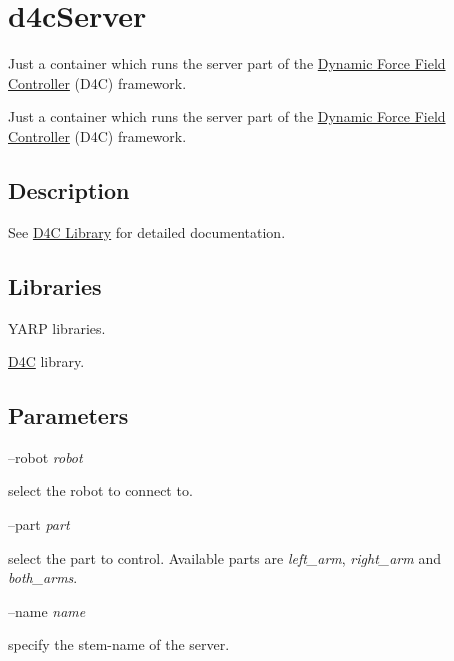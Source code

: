 \section{d4c\+Server}
\label{group__d4cServer}


Just a container which runs the server part of the \hyperlink{group__d4c}{Dynamic Force Field Controller} (D4\+C) framework.  


Just a container which runs the server part of the \hyperlink{group__d4c}{Dynamic Force Field Controller} (D4\+C) framework. 

\hypertarget{group__d4cServer_intro_sec}{}\subsection{Description}\label{group__d4cServer_intro_sec}
See \hyperlink{group__d4c}{D4\+C Library} for detailed documentation.\hypertarget{group__d4cServer_lib_sec}{}\subsection{Libraries}\label{group__d4cServer_lib_sec}

\begin{DoxyItemize}
\item Y\+A\+R\+P libraries.
\item \hyperlink{group__d4c}{D4\+C} library.
\end{DoxyItemize}\hypertarget{group__d4cServer_parameters_sec}{}\subsection{Parameters}\label{group__d4cServer_parameters_sec}
--robot {\itshape robot} 
\begin{DoxyItemize}
\item select the robot to connect to.
\end{DoxyItemize}

--part {\itshape part} 
\begin{DoxyItemize}
\item select the part to control. Available parts are {\itshape left\+\_\+arm}, {\itshape right\+\_\+arm} and {\itshape {\itshape both\+\_\+arms}}.
\end{DoxyItemize}

--name {\itshape name} 
\begin{DoxyItemize}
\item specify the stem-\/name of the server.
\end{DoxyItemize}

